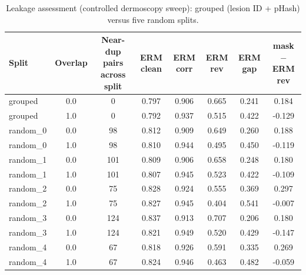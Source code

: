 \begin{table}[H]\centering\scriptsize
\caption{Leakage assessment (controlled dermoscopy sweep): grouped (lesion ID + pHash) versus five random splits.}\label{tab:leak}
\begin{tabular}{lccccccc}\toprule
Split & Overlap & Near-dup pairs across split & ERM clean & ERM corr & ERM rev & ERM gap & mask$-$ERM rev \\\midrule
grouped & 0.0 & 0 & 0.797 & 0.906 & 0.665 & 0.241 & 0.184 \\
grouped & 1.0 & 0 & 0.792 & 0.937 & 0.515 & 0.422 & -0.129 \\
random\_0 & 0.0 & 98 & 0.812 & 0.909 & 0.649 & 0.260 & 0.188 \\
random\_0 & 1.0 & 98 & 0.810 & 0.944 & 0.495 & 0.450 & -0.119 \\
random\_1 & 0.0 & 101 & 0.809 & 0.906 & 0.658 & 0.248 & 0.180 \\
random\_1 & 1.0 & 101 & 0.807 & 0.945 & 0.523 & 0.422 & -0.109 \\
random\_2 & 0.0 & 75 & 0.828 & 0.924 & 0.555 & 0.369 & 0.297 \\
random\_2 & 1.0 & 75 & 0.827 & 0.945 & 0.404 & 0.541 & -0.007 \\
random\_3 & 0.0 & 124 & 0.837 & 0.913 & 0.707 & 0.206 & 0.180 \\
random\_3 & 1.0 & 124 & 0.821 & 0.949 & 0.520 & 0.429 & -0.147 \\
random\_4 & 0.0 & 67 & 0.818 & 0.926 & 0.591 & 0.335 & 0.269 \\
random\_4 & 1.0 & 67 & 0.824 & 0.946 & 0.463 & 0.482 & -0.059 \\
\bottomrule\end{tabular}\end{table}
